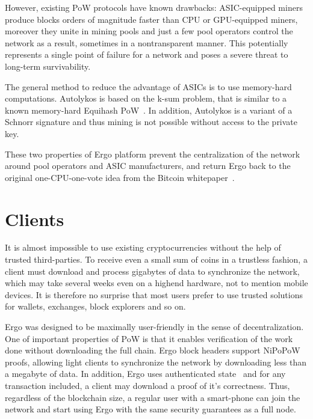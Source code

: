 \documentclass[]{article}
\begin{document}
    However, existing PoW protocols have known drawbacks: ASIC-equipped miners produce
    blocks orders of magnitude faster than CPU or GPU-equipped miners, moreover they unite in
    mining pools and just a few pool operators control the network as a result, sometimes in a nontransparent
    manner. This potentially represents a single point of failure for a network and poses
    a severe threat to long-term survivability.

    The general method to reduce the advantage of ASICs is to use memory-hard computations.
    Autolykos is based on the k-sum problem, that is similar to a known memory-hard Equihash
    PoW~\cite{biryukov2017equihash}. In addition, Autolykos is a variant of a Schnorr signature and thus mining is not
    possible without access to the private key.

    These two properties of Ergo platform prevent the centralization of the network around pool
    operators and ASIC manufacturers, and return Ergo back to the original one-CPU-one-vote idea
    from the Bitcoin whitepaper~\cite{nakamoto2008bitcoin}.

    \section{Clients}

    It is almost impossible to use existing cryptocurrencies without the help of trusted third-parties.
    To receive even a small sum of coins in a trustless fashion, a client must download and process
    gigabytes of data to synchronize the network, which may take several weeks even on a highend
    hardware, not to mention mobile devices. It is therefore no surprise that most users prefer
    to use trusted solutions for wallets, exchanges, block explorers and so on.

    Ergo was designed to be maximally user-friendly in the sense of decentralization. One of
    important properties of PoW is that it enables verification of the work done without downloading
    the full chain. Ergo block headers support NiPoPoW~\cite{kiayias2017non} proofs, allowing light clients to
    synchronize the network by downloading less than a megabyte of data. In addition, Ergo uses
    authenticated state~\cite{reyzin2017improving} and for any transaction included, a client may download a proof of it’s
    correctness. Thus, regardless of the blockchain size, a regular user with a smart-phone can join
    the network and start using Ergo with the same security guarantees as a full node.
\end{document}
